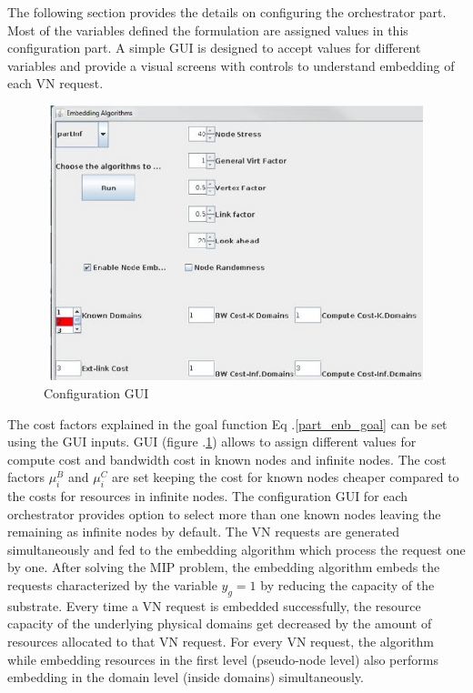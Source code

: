 \documentclass[article,dr=phil,type=msc ,colorback,accentcolor=tud4b]{tudthesis}
\begin{document}
The following section provides the details on configuring the orchestrator part. Most of the variables defined the formulation are assigned values in this configuration part. A simple GUI is designed to accept values for different variables and provide a visual screens with controls to understand embedding of each VN request.\newline

\begin{figure}[h]
	\centering
	\includegraphics[width=13cm, height=8cm]{config.jpg}
	\caption{Configuration GUI}
	\label{config}
\end{figure}

The cost factors explained in the goal function Eq .\ref{part_enb_goal} can be set using the GUI inputs. GUI (figure .\ref{config}) allows to assign different values for compute cost and bandwidth cost in known nodes and infinite nodes. The cost factors $\mu_{i}^{B}$ and  $\mu_{i}^{C}$ are set keeping the cost for known nodes cheaper compared to the costs for resources in infinite nodes. The configuration GUI for each orchestrator provides option to select more than one known nodes leaving the remaining as infinite nodes by default. The VN requests are generated simultaneously and fed to the embedding algorithm which process the request one by one. After solving the MIP problem, the embedding algorithm embeds the requests characterized by the variable $y_{g} = 1$ by reducing the capacity of the substrate. Every time a VN request is embedded successfully, the resource capacity of the underlying physical domains get decreased by the amount of resources allocated to that VN request. For every VN request, the algorithm while embedding resources in the first level (pseudo-node level) also performs embedding in the domain level (inside domains) simultaneously.\newline
\end{document}
